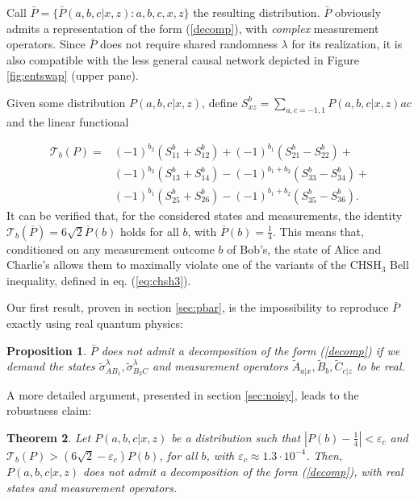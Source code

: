 \documentclass[onecolumn,prx,amsmath,amssymb]{revtex4-2}
\newtheorem{theo}{Theorem}
\newtheorem{prop}[theo]{Proposition}
\begin{document}
\begin{appendix}
Call $\bar{P}=\{\bar{P}(a,b,c|x,z):a,b,c,x,z\}$ the resulting distribution. $\bar{P}$ obviously admits a representation of the form (\ref{decomp}), with \emph{complex} measurement operators. Since $\bar{P}$ does not require shared randomness $\lambda$ for its realization, it is also compatible with the less general causal network depicted in Figure \ref{fig:entswap} (upper pane).


Given some distribution $P(a,b,c|x,z)$, define $S^b_{xz}=\sum_{a,c=-1,1}P(a,b,c|x,z)ac$ and the linear functional

\begin{align}
\mathscr{T}_b(P)=& (-1)^{b_2}(S_{11}^b+S^b_{12})+(-1)^{b_1}(S^b_{21}-S^b_{22})+\nonumber\\
&(-1)^{b_2}(S^b_{13}+S^b_{14})-(-1)^{b_1+b_2}(S^b_{33}-S^b_{34})+\nonumber\\
& (-1)^{b_1}(S^b_{25}+S^b_{26})-(-1)^{b_1+b_2}(S^b_{35}-S^b_{36}).
\label{adjusted_3CHSH}
\end{align}
It can be verified that, for the considered states and measurements, the identity $\mathscr{T}_b(\bar{P})=6\sqrt{2}\bar{P}(b)$ holds for all $b$, with $\bar{P}(b)=\frac{1}{4}$. This means that, conditioned on any measurement outcome $b$ of Bob's, the state of Alice and Charlie's allows them to maximally violate one of the variants of the $\text{CHSH}_3$ Bell inequality, defined in eq. (\ref{eq:chsh3}).

Our first result, proven in section \ref{sec:pbar}, is the impossibility to reproduce $\bar{P}$ exactly using real quantum physics:

\begin{prop}
\label{exact_case}
$\bar{P}$ does not admit a decomposition of the form (\ref{decomp}) if we demand the states $\tilde{\sigma}_{AB_1}^\lambda,\tilde{\sigma}_{B_2C}^\lambda$ and measurement operators $\tilde{A}_{a|x},\tilde{B}_{b},\tilde{C}_{c|z}$ to be real.
\end{prop}

A more detailed argument, presented in section \ref{sec:noisy}, leads to the robustness claim:

\begin{theo}
\label{approximate_case}
Let $P(a,b,c|x,z)$ be a distribution such that $|P(b)-\frac{1}{4}|< \varepsilon_c$ and $\mathscr{T}_b(P)>(6\sqrt{2}-\varepsilon_c)P(b)$, for all $b$, with $\varepsilon_c\approx 1.3\cdot 10^{-4}$. Then, $P(a,b,c|x,z)$ does not admit a decomposition of the form (\ref{decomp}), with real states and measurement operators.
\end{theo}


\end{appendix}
\end{document}
